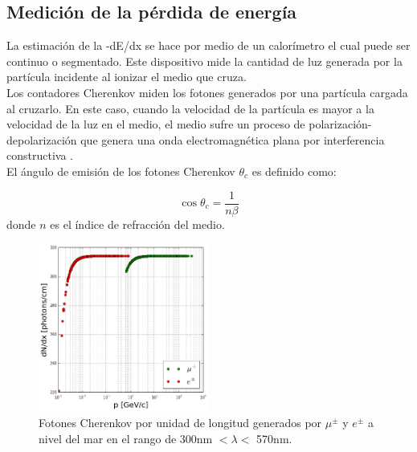 \subsection{Medición de la pérdida de energía}

La estimación de la -dE/dx se hace por medio de un calorímetro el cual puede ser continuo o segmentado. Este dispositivo mide la cantidad de luz generada por la partícula incidente al ionizar el medio que cruza.\\

Los contadores Cherenkov miden los fotones generados por una partícula cargada al cruzarlo. En este caso, cuando la velocidad de la partícula es mayor a la velocidad de la luz en el medio, el medio sufre un proceso de polarización-depolarización que genera una onda electromagnética plana por interferencia constructiva \cite{Kolanoski2016}.\\

El ángulo de emisión de los fotones Cherenkov $\theta_c$ es definido como:

\begin{equation}
    \cos \theta_c = \frac{1}{n\beta}
\end{equation}
donde $n$ es el índice de refracción del medio.

\begin{figure}[h!]
\begin{center}
\includegraphics[width=0.5\textwidth]{Figures/dNdx_spec.png}
\caption[Fotones Cherenkov por unidad de longitud generados por $\mu^{\pm}$ y $e^{\pm}$ a nivel del mar en el rango de 300nm $< \lambda <$ 570nm]{Fotones Cherenkov por unidad de longitud generados por $\mu^{\pm}$ y $e^{\pm}$ a nivel del mar en el rango de 300nm $< \lambda <$ 570nm\cite{Vasquez2018, Motta2018}.}
\label{dNdx}
\end{center}
\end{figure}

